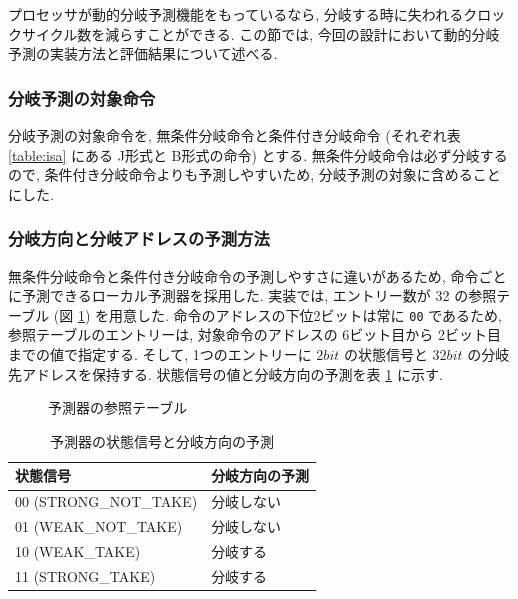 \documentclass[../improvements.tex]{subflies}
\begin{document}
  プロセッサが動的分岐予測機能をもっているなら, 
  分岐する時に失われるクロックサイクル数を減らすことができる.
  この節では, 今回の設計において動的分岐予測の実装方法と評価結果について述べる.

  \subsubsection{分岐予測の対象命令}
  分岐予測の対象命令を, 無条件分岐命令と条件付き分岐命令 
  (それぞれ表 \ref{table:isa} にある J形式と B形式の命令) とする.
  無条件分岐命令は必ず分岐するので, 条件付き分岐命令よりも予測しやすいため, 
  分岐予測の対象に含めることにした.

  \subsubsection{分岐方向と分岐アドレスの予測方法}
  無条件分岐命令と条件付き分岐命令の予測しやすさに違いがあるため, 
  命令ごとに予測できるローカル予測器を採用した\cite{ca-quantitative-approach}.
  実装では, エントリー数が 32 の参照テーブル (図 \ref{fig:predictor-table}) を用意した.
  命令のアドレスの下位2ビットは常に \verb|00| であるため, 
  参照テーブルのエントリーは, 対象命令のアドレスの 6ビット目から 2ビット目までの値で指定する.
  そして, 1つのエントリーに $2bit$ の状態信号と $32bit$ の分岐先アドレスを保持する.
  状態信号の値と分岐方向の予測を表 \ref{table:predictor-state} に示す.

  \begin{figure}
    \caption{予測器の参照テーブル}
    \label{fig:predictor-table}
  \end{figure}

  \begin{table}[h!]
    \centering
    \begin{tabular}{|l|l|}
    \hline
    状態信号 & 分岐方向の予測 \\ \hline
    00 (STRONG\_NOT\_TAKE) & 分岐しない \\
    01 (WEAK\_NOT\_TAKE) & 分岐しない \\
    10 (WEAK\_TAKE) & 分岐する \\
    11 (STRONG\_TAKE) & 分岐する \\ \hline
    \end{tabular}
    \caption{予測器の状態信号と分岐方向の予測}
    \label{table:predictor-state}
  \end{table}
\end{document}
